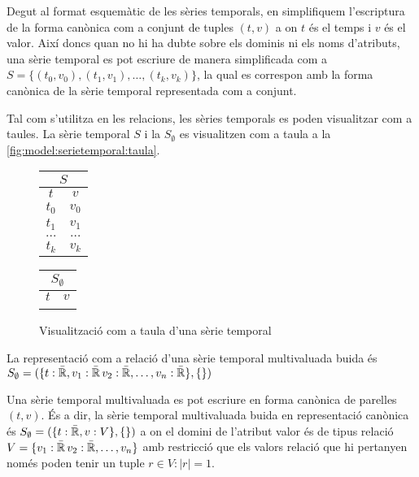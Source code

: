 Degut al format esquemàtic de les sèries temporals, en simplifiquem
l'escriptura de la forma canònica com a conjunt de tuples $(t,v)$ a on
$t$ és el temps i $v$ és el valor. Així doncs quan no hi ha dubte
sobre els dominis ni els noms d'atributs, una sèrie temporal es pot
escriure de manera simplificada com a $S = \{ (t_0,v_0), (t_1,v_1),
\dotsc, (t_k,v_k) \}$, la qual es correspon amb la forma canònica de
la sèrie temporal representada com a conjunt.

Tal com s'utilitza en les relacions, les sèries temporals es poden
visualitzar com a taules. La sèrie temporal $S$ i la $S_{\emptyset}$
es visualitzen com a taula a la
\autoref{fig:model:serietemporal:taula}.

\begin{figure}[tp]
  \centering
  \begin{tabular}[c]{|c|c|}
    \multicolumn{2}{c}{$S$} \\ \hline
    $t$  & $v$ \\ \hline
    $t_0$  & $v_0$ \\
    $t_1$  & $v_1$ \\
    $\dots$  & $\dots$ \\ 
    $t_k$  & $v_k$ \\ \hline
  \end{tabular} \qquad
  \begin{tabular}[c]{|c|c|}
    \multicolumn{2}{c}{$S_{\emptyset}$} \\ \hline
    $t$  & $v$ \\ \hline
      &  \\ \hline
  \end{tabular}
  \caption{Visualització com a taula d'una sèrie temporal}
  \label{fig:model:serietemporal:taula}
\end{figure}




\begin{definition}
  La representació com a relació d'una sèrie temporal multivaluada buida és
  $S_{\emptyset} = ( \{t: \bar{\mathbb{R}{}}, v_1: \bar{\mathbb{R}{}}\,
  v_2: \bar{\mathbb{R}{}}, \dotsc, v_n: \bar{\mathbb{R}{}}\}, \{ \} )$

  Una sèrie temporal multivaluada es pot escriure en forma canònica de
  parelles $(t,v)$. És a dir, la sèrie temporal multivaluada buida en
  representació canònica és $S_{\emptyset} = ( \{t: \bar{\mathbb{R}{}},
  v: V \}, \{ \} )$ a on el domini de l'atribut valor és de tipus
  relació $V = \{ v_1: \bar{\mathbb{R}{}}\, v_2: \bar{\mathbb{R}{}},
  \dotsc, v_n \}$ amb restricció que els valors relació que hi
  pertanyen només poden tenir un tuple $r \in V: |r| = 1$.
\end{definition}

